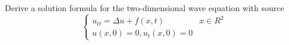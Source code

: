 Derive a solution formula for the two-dimensional wave equation with source
$$
\begin{cases}
  u_{tt} = \Delta u + f(x, t) & x \in R^2\\
  u(x, 0) = 0, u_t(x, 0) = 0
\end{cases}
$$
